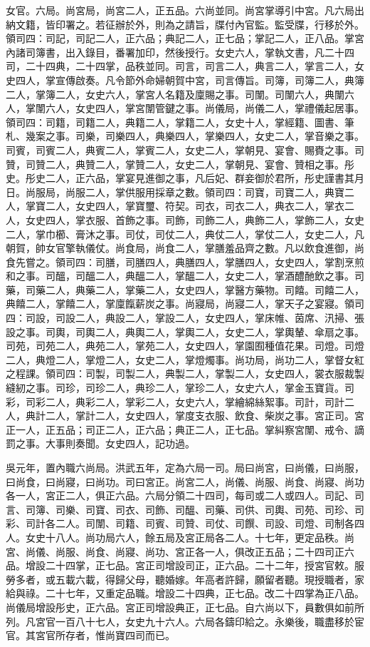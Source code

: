 女官。六局。尚宮局，尚宮二人，正五品。六尚並同。尚宮掌導引中宮。凡六局出納文籍，皆印署之。若征辦於外，則為之請旨，牒付內官監。監受牒，行移於外。領司四：司記，司記二人，正六品；典記二人，正七品；掌記二人，正八品。掌宮內諸司簿書，出入錄目，番署加印，然後授行。女史六人，掌執文書，凡二十四司，二十四典，二十四掌，品秩並同。司言，司言二人，典言二人，掌言二人，女史四人，掌宣傳啟奏。凡令節外命婦朝賀中宮，司言傳旨。司簿，司簿二人，典簿二人，掌簿二人，女史六人，掌宮人名籍及廩賜之事。司闈。司闈六人，典闈六人，掌闈六人，女史四人，掌宮闈管鍵之事。尚儀局，尚儀二人，掌禮儀起居事。領司四：司籍，司籍二人，典籍二人，掌籍二人，女史十人，掌經籍、圖書、筆札、幾案之事。司樂，司樂四人，典樂四人，掌樂四人，女史二人，掌音樂之事。司賓，司賓二人，典賓二人，掌賓二人，女史二人，掌朝見、宴會、賜賚之事。司贊，司贊二人，典贊二人，掌贊二人，女史二人，掌朝見、宴會、贊相之事。彤史。彤史二人，正六品，掌宴見進御之事，凡后妃、群妾御於君所，彤史謹書其月日。尚服局，尚服二人，掌供服用採章之數。領司四：司寶，司寶二人，典寶二人，掌寶二人，女史四人，掌寶璽、符契。司衣，司衣二人，典衣二人，掌衣二人，女史四人，掌衣服、首飾之事。司飾，司飾二人，典飾二人，掌飾二人，女史二人，掌巾櫛、膏沐之事。司仗，司仗二人，典仗二人，掌仗二人，女史二人，凡朝賀，帥女官擎執儀仗。尚食局，尚食二人，掌膳羞品齊之數。凡以飲食進御，尚食先嘗之。領司四：司膳，司膳四人，典膳四人，掌膳四人，女史四人，掌割烹煎和之事。司醞，司醞二人，典醞二人，掌醞二人，女史二人，掌酒醴酏飲之事。司藥，司藥二人，典藥二人，掌藥二人，女史四人，掌醫方藥物。司饎。司饎二人，典饎二人，掌饎二人，掌廩餼薪炭之事。尚寢局，尚寢二人，掌天子之宴寢。領司四：司設，司設二人，典設二人，掌設二人，女史四人，掌床帷、茵席、汛掃、張設之事。司輿，司輿二人，典輿二人，掌輿二人，女史二人，掌輿輦、傘扇之事。司苑，司苑二人，典苑二人，掌苑二人，女史四人，掌園囿種值花果。司燈。司燈二人，典燈二人，掌燈二人，女史二人，掌燈燭事。尚功局，尚功二人，掌督女紅之程課。領司四：司製，司製二人，典製二人，掌製二人，女史四人，裳衣服裁製縫紉之事。司珍，司珍二人，典珍二人，掌珍二人，女史六人，掌金玉寶貨。司彩，司彩二人，典彩二人，掌彩二人，女史六人，掌繪綿絲絮事。司計，司計二人，典計二人，掌計二人，女史四人，掌度支衣服、飲食、柴炭之事。宮正司。宮正一人，正五品；司正二人，正六品；典正二人，正七品。掌糾察宮闈、戒令、謫罰之事。大事則奏聞。女史四人，記功過。

吳元年，置內職六尚局。洪武五年，定為六局一司。局曰尚宮，曰尚儀，曰尚服，曰尚食，曰尚寢，曰尚功。司曰宮正。尚宮二人，尚儀、尚服、尚食、尚寢、尚功各一人，宮正二人，俱正六品。六局分領二十四司，每司或二人或四人。司記、司言、司簿、司樂、司寶、司衣、司飾、司醞、司藥、司供、司輿、司苑、司珍、司彩、司計各二人。司闈、司籍、司賓、司贊、司仗、司饌、司設、司燈、司制各四人。女史十八人。尚功局六人，餘五局及宮正局各二人。十七年，更定品秩。尚宮、尚儀、尚服、尚食、尚寢、尚功、宮正各一人，俱改正五品；二十四司正六品。增設二十四掌，正七品。宮正司增設司正，正六品。二十二年，授宮官敕。服勞多者，或五載六載，得歸父母，聽婚嫁。年高者許歸，願留者聽。現授職者，家給與祿。二十七年，又重定品職。增設二十四典，正七品。改二十四掌為正八品。尚儀局增設彤史，正六品。宮正司增設典正，正七品。自六尚以下，員數俱如前所列。凡宮官一百八十七人，女史九十六人。六局各鑄印給之。永樂後，職盡移於宦官。其宮官所存者，惟尚寶四司而已。

